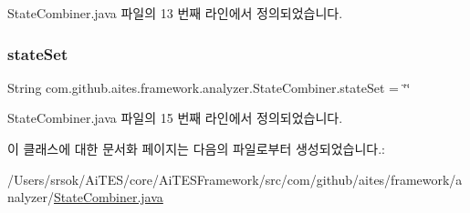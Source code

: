 State\+Combiner.\+java 파일의 13 번째 라인에서 정의되었습니다.

\mbox{\label{classcom_1_1github_1_1aites_1_1framework_1_1analyzer_1_1_state_combiner_a22e4dfec53b75aec655f02328f96f4c0}} 
\subsubsection{\texorpdfstring{state\+Set}{stateSet}}
{\footnotesize\ttfamily String com.\+github.\+aites.\+framework.\+analyzer.\+State\+Combiner.\+state\+Set = \char`\"{}\char`\"{}\hspace{0.3cm}{\ttfamily [private]}}



State\+Combiner.\+java 파일의 15 번째 라인에서 정의되었습니다.



이 클래스에 대한 문서화 페이지는 다음의 파일로부터 생성되었습니다.\+:\begin{DoxyCompactItemize}
\item 
/\+Users/srsok/\+Ai\+T\+E\+S/core/\+Ai\+T\+E\+S\+Framework/src/com/github/aites/framework/analyzer/\mbox{\hyperlink{_state_combiner_8java}{State\+Combiner.\+java}}\end{DoxyCompactItemize}
